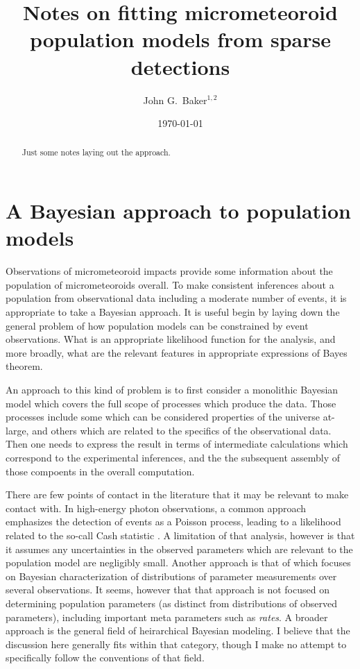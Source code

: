 \documentclass[twocolumn,showpacs,aps,prd,nobibnotes,nofootinbib,floatfix]{revtex4-1}
\begin{document}
\date{\today}
\title{Notes on fitting micrometeoroid population models from sparse detections}
\author{John G.~Baker$^{1,2}$}

\begin{abstract}
  Just some notes laying out the approach.
\end{abstract}
\maketitle
\section{A Bayesian approach to population models}
Observations of micrometeoroid impacts provide some information about the population of micrometeoroids overall.  To make consistent inferences about a population from observational data including a moderate number of events, it is appropriate to take a Bayesian approach.  It is useful begin by laying down the general problem of how population models can be constrained by event observations. What is an appropriate likelihood function for the analysis, and more broadly, what are the relevant features in appropriate expressions of Bayes theorem.

An approach to this kind of problem is to first consider a monolithic Bayesian model which covers the full scope of processes which produce the data.  Those processes include some which can be considered properties of the universe at-large, and others which are related to the specifics of the observational data.  Then one needs to express the result in terms of intermediate calculations which correspond to the experimental inferences, and the the subsequent assembly of those compoents in the overall computation.

There are few points of contact in the literature that it may be relevant to make contact with.  In high-energy photon observations, a common approach emphasizes the detection of events as a Poisson process, leading to a likelihood related to the so-call Cash statistic \cite{Cash79}.  A limitation of that analysis, however is that it assumes any uncertainties in the observed parameters which are relevant to the population model are negligibly small.  Another approach is that of \cite{Mandel2010} which focuses on Bayesian characterization of distributions of parameter measurements over several observations.  It seems, however that that approach is not focused on determining population parameters (as distinct from distributions of observed parameters), including important meta parameters such as \emph{rates}.  A broader approach is the general field of heirarchical Bayesian modeling.  I believe that the discussion here generally fits within that category, though I make no attempt to specifically follow the conventions of that field.
\end{document}

